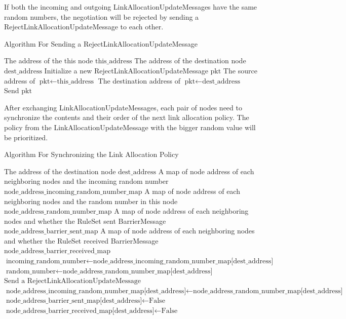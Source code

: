If both the incoming and outgoing LinkAllocationUpdateMessages have the same random numbers, the negotiation will be rejected by sending a RejectLinkAllocationUpdateMessage to each other.
\begin{algorithm}[H]  
  \begin{minipage}{0.8\linewidth}
  \caption{Algorithm For Sending a RejectLinkAllocationUpdateMessage}             
  \begin{algorithmic}[1]
    \Require The address of the this node $\text{this\_address}$      
    \Require The address of the destination node $\text{dest\_address}$    
    \State Initialize a new RejectLinkAllocationUpdateMessage $\text{pkt}$
    \State The source address of $\text{pkt} \gets \text{this\_address}$
    \State The destination address of $\text{pkt} \gets \text{dest\_address}$
    \State Send $\text{pkt}$
  \end{algorithmic}
\end{minipage}
\end{algorithm}

After exchanging LinkAllocationUpdateMessages, each pair of nodes need to synchronize the contents and their order of the next link allocation policy.
The policy from the LinkAllocationUpdateMessage with the bigger random value will be prioritized.

\begin{algorithm}[H]  
  \begin{minipage}{0.8\linewidth}
  \caption{Algorithm For Synchronizing the Link Allocation Policy}                 
  \begin{algorithmic}[1]
    \Require The address of the destination node $\text{dest\_address}$
    \Require A map of node address of each neighboring nodes and the incoming random number $\text{node\_address\_incoming\_random\_number\_map}$
    \Require A map of node address of each neighboring nodes and the random number in this node $\text{node\_address\_random\_number\_map}$
    \Require  A map of node address of each neighboring nodes and whether the RuleSet sent BarrierMessage $\text{node\_address\_barrier\_sent\_map}$
    \Require  A map of node address of each neighboring nodes and whether the RuleSet received BarrierMessage $\text{node\_address\_barrier\_received\_map}$
    \State $\text{incoming\_random\_number} \gets \text{node\_address\_incoming\_random\_number\_map[dest\_address]}$
    \State $\text{random\_number} \gets \text{node\_address\_random\_number\_map[dest\_address]}$
      \State $\text{Send a RejectLinkAllocationUpdateMessage}$
      \State $\text{node\_address\_incoming\_random\_number\_map[dest\_address]} \gets \text{node\_address\_random\_number\_map[dest\_address]}$
      \State $\text{node\_address\_barrier\_sent\_map[dest\_address]} \gets \text{False}$
      \State $\text{node\_address\_barrier\_received\_map[dest\_address]} \gets \text{False}$
    \EndIf
  \end{algorithmic}
\end{minipage}
\end{algorithm}

